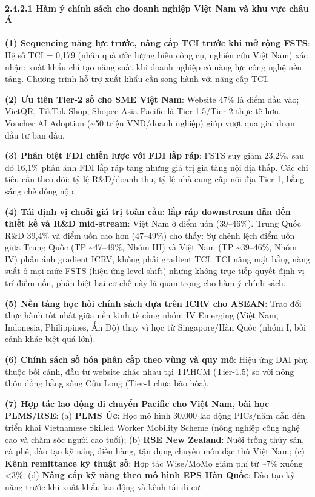 \documentclass[12pt,a4paper]{article}
\begin{document}
\hypertarget{2421-huxe0m-uxfd-chuxednh-suxe1ch-cho-doanh-nghiux1ec7p-viux1ec7t-nam-vuxe0-khu-vux1ef1c-chuxe2u-uxe1}{%
\paragraph{2.4.2.1 Hàm ý chính sách cho doanh nghiệp Việt Nam và khu vực
châu
Á}\label{2421-huxe0m-uxfd-chuxednh-suxe1ch-cho-doanh-nghiux1ec7p-viux1ec7t-nam-vuxe0-khu-vux1ef1c-chuxe2u-uxe1}}

\textbf{(1) Sequencing năng lực trước, nâng cấp TCI trước khi mở rộng
FSTS}: Hệ số TCI = 0,179 (nhân quả ước lượng biến công cụ, nghiên cứu
Việt Nam) xác nhận: xuất khẩu chỉ tạo năng suất khi doanh nghiệp có năng
lực công nghệ nền tảng. Chương trình hỗ trợ xuất khẩu cần song hành với
nâng cấp TCI.

\textbf{(2) Ưu tiên Tier-2 số cho SME Việt Nam}: Website 47\% là điểm
đầu vào; VietQR, TikTok Shop, Shopee Asia Pacific là Tier-1.5/Tier-2
thực tế hơn. Voucher AI Adoption (\textasciitilde50 triệu VND/doanh
nghiệp) giúp vượt qua giai đoạn đầu tư ban đầu.

\textbf{(3) Phân biệt FDI chiến lược với FDI lắp ráp}: FSTS suy giảm
23,2\%, sau đó 16,1\% phản ánh FDI lắp ráp tăng nhưng giá trị gia tăng
nội địa thấp. Các chỉ tiêu cần theo dõi: tỷ lệ R\&D/doanh thu, tỷ lệ nhà
cung cấp nội địa Tier-1, bằng sáng chế đồng nộp.

\textbf{(4) Tái định vị chuỗi giá trị toàn cầu: lắp ráp downstream dẫn
đến thiết kế và R\&D mid-stream}: Việt Nam ở điểm uốn (39--46\%). Trung
Quốc R\&D 39,4\% và điểm uốn cao hơn (47--49\%) cho thấy: Sự chênh lệch
điểm uốn giữa Trung Quốc (TP \textasciitilde47--49\%, Nhóm III) và Việt
Nam (TP \textasciitilde39--46\%, Nhóm IV) phản ánh gradient ICRV, không
phải gradient TCI. TCI nâng mặt bằng năng suất ở mọi mức FSTS (hiệu ứng
level-shift) nhưng không trực tiếp quyết định vị trí điểm uốn, phân biệt
hai cơ chế này là quan trọng cho hàm ý chính sách.

\textbf{(5) Nền tảng học hỏi chính sách dựa trên ICRV cho ASEAN}: Trao
đổi thực hành tốt nhất giữa nền kinh tế cùng nhóm IV Emerging (Việt Nam,
Indonesia, Philippines, Ấn Độ) thay vì học từ Singapore/Hàn Quốc (nhóm
I, bối cảnh khác biệt quá lớn).

\textbf{(6) Chính sách số hóa phân cấp theo vùng và quy mô}: Hiệu ứng
DAI phụ thuộc bối cảnh, đầu tư website khác nhau tại TP.HCM (Tier-1.5)
so với nông thôn đồng bằng sông Cửu Long (Tier-1 chưa bão hòa).

\textbf{(7) Hợp tác lao động di chuyển Pacific cho Việt Nam, bài học
PLMS/RSE}: (a) \textbf{PLMS Úc}: Học mô hình 30.000 lao động PICs/năm
dẫn đến triển khai Vietnamese Skilled Worker Mobility Scheme (nông
nghiệp công nghệ cao và chăm sóc người cao tuổi); (b) \textbf{RSE New
Zealand}: Nuôi trồng thủy sản, cà phê, đào tạo kỹ năng điều hàng, tận
dụng chuyên môn đặc thù Việt Nam; (c) \textbf{Kênh remittance kỹ thuật
số}: Hợp tác Wise/MoMo giảm phí từ \textasciitilde7\% xuống
\textless3\%; (d) \textbf{Nâng cấp kỹ năng theo mô hình EPS Hàn Quốc}:
Đào tạo kỹ năng trước khi xuất khẩu lao động và kênh tái di cư.
\end{document}
